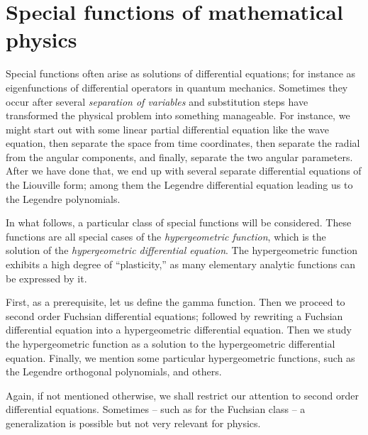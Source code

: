 \chapter{Special functions of mathematical physics}
\label{2011-m-ch-sf}


Special functions\marginnote{This chapter follows several approaches:
\cite{lebedev:1965:sft,Wilf,bell-specfun,andrews:1999:sfu,Kuznetsov,Kisil}}
   often arise as solutions of differential equations; for instance as eigenfunctions
of differential operators in quantum mechanics.
Sometimes they occur  after several {\em separation of variables}
and substitution steps have transformed the physical problem into something manageable.
For instance, we might start out with some linear partial differential equation like the wave equation,
then separate the space from time coordinates,
then separate the radial from the angular components,
and finally, separate the two angular parameters.
After we have done that, we end up with several separate differential equations of the Liouville form;
among them the Legendre differential equation leading us to the Legendre polynomials.

In what follows, a particular class of special functions will be considered.
These functions are all special cases of the
{\em hypergeometric function},
which is the solution of the
{\em hypergeometric differential equation}.
The hypergeometric function exhibits a high degree of
``plasticity,''
as many elementary analytic functions can be expressed by it.

First, as a prerequisite, let us define the gamma function.
Then we proceed to second order Fuchsian differential equations;
followed by rewriting a Fuchsian  differential equation
into a hypergeometric differential equation.
Then we study the hypergeometric function as a solution to the
hypergeometric differential equation.
Finally, we mention some particular hypergeometric functions, such as the
Legendre orthogonal polynomials, and others.

Again, if not mentioned otherwise, we shall restrict our attention to
second order differential equations.
Sometimes -- such as for the Fuchsian class -- a generalization is possible but
not very relevant for physics.

